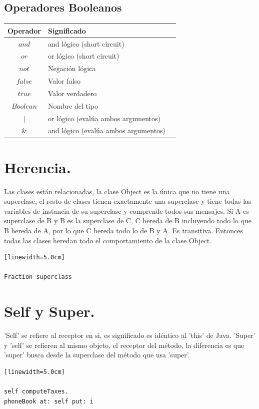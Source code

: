 \documentclass[10pt,journal,compsoc]{IEEEtran}
\begin{document}
\subsection{Operadores Booleanos}
\begin{tabular}{c p{6cm} p{15cm}}
	Operador & Significado\\
	\hline\hline
	$and$ & and l\'ogico (short circuit)\\\hline
	$or$ & or l\'ogico (short circuit)\\\hline
	$not$ & Negaci\'on l\'ogica\\\hline
	$false$ & Valor falso\\\hline
	$true$ & Valor verdadero\\\hline
	$Boolean$ & Nombre del tipo\\\hline
	$|$ & or l\'ogico (eval\'ua ambos argumentos)\\\hline
	\& & and l\'ogico (eval\'ua ambos argumentos)\\
	\hline 
\end{tabular}

\section{Herencia.}
Las clases est\'an relacionadas, la clase Object es la \'unica que no tiene una superclase, el resto de clases tienen exactamente una superclase y tiene todas las variables de instancia de su superclase y comprende todos sus mensajes.
Si A es superclase de B y B es la superclase de C, C hereda de B incluyendo todo lo que B hereda de A, por lo que C hereda todo lo de B y A. Es transitiva. Entonces todas las clases heredan todo el comportamiento de la clase Object.
\begin{lstlisting}[language=Smalltalk, caption = {Ejemplo para conocer la superclase de una clase.}][linewidth=5.0cm]

Fraction superclass

\end{lstlisting}

\section{Self y Super.}
'Self' se refiere al receptor en si, es significado es id\'entico al 'this' de Java. 'Super' y 'self' se refieren al mismo objeto, el receptor del m\'etodo, la diferencia es que 'super' busca desde la superclase del m\'etodo que usa 'super'.
\begin{lstlisting}[language=Smalltalk, caption = {Ejemplo del "Self".}][linewidth=5.0cm]

self computeTaxes.
phoneBook at: self put: i

\end{lstlisting}
\end{document}

